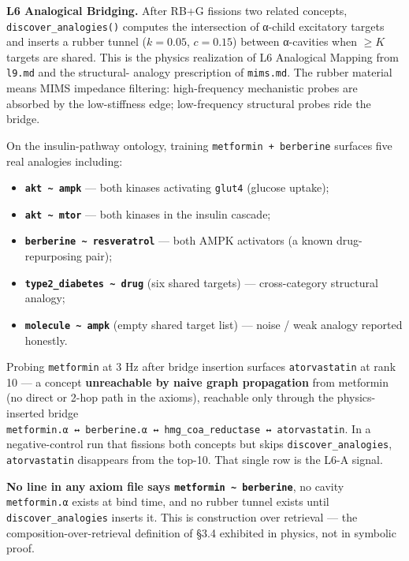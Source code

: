 \documentclass[
  11pt,
  a4paper,
]{article}
\providecommand{\tightlist}{%
  \setlength{\itemsep}{0pt}\setlength{\parskip}{0pt}}
\begin{document}
\textbf{L6 Analogical Bridging.} After RB+G fissions two related
concepts, \texttt{discover\_analogies()} computes the intersection of
α-child excitatory targets and inserts a rubber tunnel (\(k=0.05\),
\(c=0.15\)) between α-cavities when \(\geq K\) targets are shared. This
is the physics realization of L6 Analogical Mapping from \texttt{l9.md}
and the structural- analogy prescription of \texttt{mims.md}. The rubber
material means MIMS impedance filtering: high-frequency mechanistic
probes are absorbed by the low-stiffness edge; low-frequency structural
probes ride the bridge.

On the insulin-pathway ontology, training
\texttt{metformin\ +\ berberine} surfaces five real analogies including:

\begin{itemize}
\tightlist
\item
  \textbf{\texttt{akt\ \textasciitilde{}\ ampk}} --- both kinases
  activating \texttt{glut4} (glucose uptake);
\item
  \textbf{\texttt{akt\ \textasciitilde{}\ mtor}} --- both kinases in the
  insulin cascade;
\item
  \textbf{\texttt{berberine\ \textasciitilde{}\ resveratrol}} --- both
  AMPK activators (a known drug-repurposing pair);
\item
  \textbf{\texttt{type2\_diabetes\ \textasciitilde{}\ drug}} (six shared
  targets) --- cross-category structural analogy;
\item
  \textbf{\texttt{molecule\ \textasciitilde{}\ ampk}} (empty shared
  target list) --- noise / weak analogy reported honestly.
\end{itemize}

Probing \texttt{metformin} at 3 Hz after bridge insertion surfaces
\texttt{atorvastatin} at rank 10 --- a concept \textbf{unreachable by
naive graph propagation} from metformin (no direct or 2-hop path in the
axioms), reachable only through the physics-inserted bridge
\texttt{metformin.α\ ↔\ berberine.α\ ↔\ hmg\_coa\_reductase\ ↔\ atorvastatin}.
In a negative-control run that fissions both concepts but skips
\texttt{discover\_analogies}, \texttt{atorvastatin} disappears from the
top-10. That single row is the L6-A signal.

\textbf{No line in any axiom file says
\texttt{metformin\ \textasciitilde{}\ berberine}}, no cavity
\texttt{metformin.α} exists at bind time, and no rubber tunnel exists
until \texttt{discover\_analogies} inserts it. This is construction over
retrieval --- the composition-over-retrieval definition of §3.4
exhibited in physics, not in symbolic proof.
\end{document}
